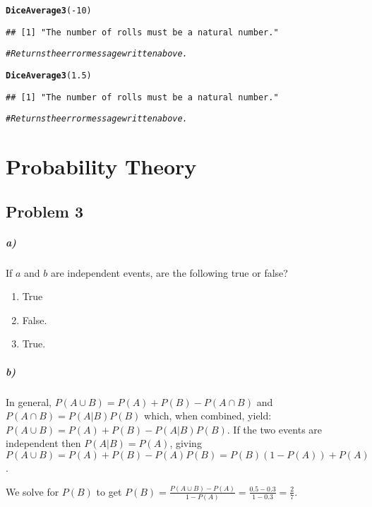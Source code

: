 \documentclass[12pt,letter]{article}\usepackage[]{graphicx}\usepackage[]{color}
\makeatletter
\newcommand{\hlnum}[1]{\textcolor[rgb]{0.686,0.059,0.569}{#1}}%
\newcommand{\hlcom}[1]{\textcolor[rgb]{0.678,0.584,0.686}{\textit{#1}}}%
\newcommand{\hlopt}[1]{\textcolor[rgb]{0,0,0}{#1}}%
\newcommand{\hlstd}[1]{\textcolor[rgb]{0.345,0.345,0.345}{#1}}%
\newcommand{\hlkwd}[1]{\textcolor[rgb]{0.737,0.353,0.396}{\textbf{#1}}}%
\newenvironment{kframe}{%
 \def\at@end@of@kframe{}%
 \ifinner\ifhmode%
  \def\at@end@of@kframe{\end{minipage}}%
  \begin{minipage}{\columnwidth}%
 \fi\fi%
 \def\FrameCommand##1{\hskip\@totalleftmargin \hskip-\fboxsep
 \colorbox{shadecolor}{##1}\hskip-\fboxsep
     \hskip-\linewidth \hskip-\@totalleftmargin \hskip\columnwidth}%
 \MakeFramed {\advance\hsize-\width
   \@totalleftmargin\z@ \linewidth\hsize
   \@setminipage}}%
 {\par\unskip\endMakeFramed%
 \at@end@of@kframe}
\newenvironment{knitrout}{}{} %
\makeatother
\begin{document}
\begin{knitrout}
\begin{kframe}
\begin{alltt}
\hlkwd{DiceAverage3}\hlstd{(}\hlopt{-}\hlnum{10}\hlstd{)}
\end{alltt}
\begin{verbatim}
## [1] "The number of rolls must be a natural number."
\end{verbatim}
\begin{alltt}
\hlcom{# Returns the error message written above.}

\hlkwd{DiceAverage3}\hlstd{(}\hlnum{1.5}\hlstd{)}
\end{alltt}
\begin{verbatim}
## [1] "The number of rolls must be a natural number."
\end{verbatim}
\begin{alltt}
\hlcom{# Returns the error message written above.}
\end{alltt}
\end{kframe}
\end{knitrout}



\section*{Probability Theory}

\subsection*{Problem 3}

\subparagraph{a)} If $a$ and $b$ are independent events, are the following true or false?
\begin{enumerate}
	\item True %
	\item False. %
	\item True. %
\end{enumerate}

\subparagraph{b)} In general, $P(A \cup B)=P(A)+P(B) - P(A \cap B)$ and $P(A \cap B)=P(A|B)P(B)$ which, when combined, yield: $P(A \cup B)=P(A)+P(B) - P(A|B)P(B)$. If the two events are independent then $P(A|B)=P(A)$, giving $P(A \cup B)=P(A)+P(B) - P(A)P(B) = P(B)(1-P(A))+P(A)$.

We solve for $P(B)$ to get $P(B)=\frac{P(A \cup B)-P(A)}{1-P(A)}=\frac{0.5-0.3}{1-0.3}=\frac{2}{7}$.
\end{document}
